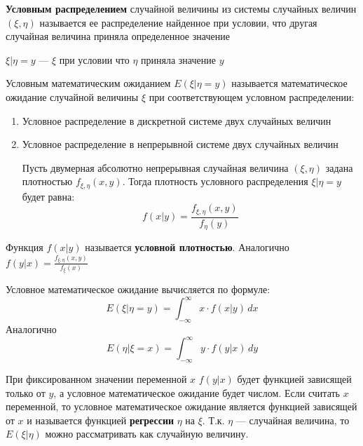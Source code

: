 \begin{definition}
    \textbf{Условным распределением} случайной величины из системы случайных величин \((\xi, \eta)\) называется ее распределение найденное при условии, что другая случайная величина приняла определенное значение
\end{definition}
\begin{obozn}
    \(\xi | \eta = y\) --- \(\xi\) при условии что \(\eta\) приняла значение \(y\)
\end{obozn}
\begin{definition}
    Условным математическим ожиданием \(E(\xi | \eta = y)\) называется математическое ожидание случайной величины \(\xi\) при соответствующем условном распределении:
    \begin{enumerate}
        \item Условное распределение в дискретной системе двух случайных величин

              \unfinished
        \item Условное распределение в непрерывной системе двух случайных величин

              Пусть двумерная абсолютно непрерывная случайная величина \((\xi, \eta)\) задана плотностью \(f_{\xi, \eta}(x, y)\). Тогда плотность условного распределения \(\xi | \eta = y\) будет равна:
              \[ f(x|y) = \frac{f_{\xi, \eta}(x, y)}{f_{\eta}(y)} \]
    \end{enumerate}
\end{definition}
\begin{definition}
    Функция \(f(x|y)\) называется \textbf{условной плотностью}. Аналогично \(f(y | x) = \frac{f_{\xi, \eta}(x, y)}{f_{\xi}(x)}\)
\end{definition}
\begin{lemma}
    Условное математическое ожидание вычисляется по формуле:
    \[ E(\xi | \eta = y) = \int_{-\infty}^\infty x\cdot f(x |y)\,dx \]
    Аналогично
    \[ E(\eta | \xi = x) = \int_{-\infty}^\infty y\cdot f(y | x)\,dy \]
\end{lemma}
\begin{remark}
    При фиксированном значении переменной \(x\) \(f(y | x)\) будет функцией зависящей только от \(y\), а условное математическое ожидание будет числом. Если считать \(x\) переменной, то условное математическое ожидание является функцией зависящей от \(x\) и называется функцией \textbf{регрессии} \(\eta\) на \(\xi\). Т.к. \(\eta\) --- случайная величина, то \(E(\xi | \eta)\) можно рассматривать как случайную величину.
\end{remark}

